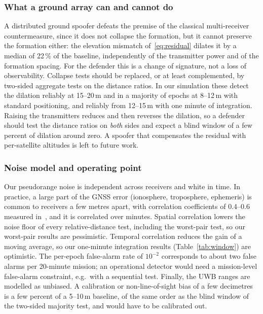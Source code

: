 \documentclass[conference]{IEEEtran}
\begin{document}
\subsubsection*{What a ground array can and cannot do}
A distributed ground spoofer defeats the premise of the classical
multi-receiver countermeasure, since it does not collapse the formation,
but it cannot preserve the formation either: the elevation mismatch
of~\eqref{eq:residual} dilates it by a median of 22\,\% of the baseline,
independently of the transmitter power and of the formation spacing. For
the defender this is a change of signature, not a loss of
observability. Collapse tests should be replaced, or at least
complemented, by two-sided aggregate tests on the distance ratios. In
our simulation these detect the dilation reliably at 15--20\,m and in a
majority of epochs at 8--12\,m with standard positioning, and reliably
from 12--15\,m with one minute of integration. Raising the transmitters
reduces and then reverses the dilation, so a defender should test the
distance ratios on \emph{both} sides and expect a blind window of a few
percent of dilation around zero. A spoofer that compensates the residual
with per-satellite altitudes is left to future work.

\subsubsection*{Noise model and operating point}
Our pseudorange noise is independent across receivers and white in
time. In practice, a large part of the GNSS error (ionosphere,
troposphere, ephemeris) is common to receivers a few metres apart, with
correlation coefficients of 0.4--0.6 measured
in~\cite{jansen2016multireceiver}, and it is correlated over minutes.
Spatial correlation lowers the noise floor of every relative-distance
test, including the worst-pair test, so our worst-pair results are
pessimistic. Temporal correlation reduces the gain of a moving average,
so our one-minute integration results (Table~\ref{tab:window}) are
optimistic. The per-epoch false-alarm rate of $10^{-2}$ corresponds to
about two false alarms per 20-minute mission; an operational detector
would need a mission-level false-alarm constraint, e.g.\ with a
sequential test. Finally, the UWB ranges are modelled as unbiased. A
calibration or non-line-of-sight bias of a few decimetres is a few
percent of a 5--10\,m baseline, of the same order as the blind window of
the two-sided majority test, and would have to be calibrated out.
\end{document}
